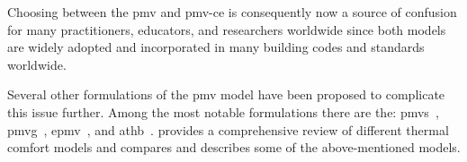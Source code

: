 Choosing between the \ac{pmv} and \ac{pmv-ce} is consequently now a source of confusion for many practitioners, educators, and researchers worldwide since both models are widely adopted and incorporated in many building codes and standards worldwide.

Several other formulations of the \ac{pmv} model have been proposed to complicate this issue further.
Among the most notable formulations there are the: \ac{pmvs}~\cite{GaggeSET}, \ac{pmvg}~\cite{GaggeSET}, \ac{epmv}~\cite{Toftum2002}, and \ac{athb}~\cite{Schweiker2022}.
 provides a comprehensive review of different thermal comfort models and compares and describes some of the above-mentioned models.

%
%

